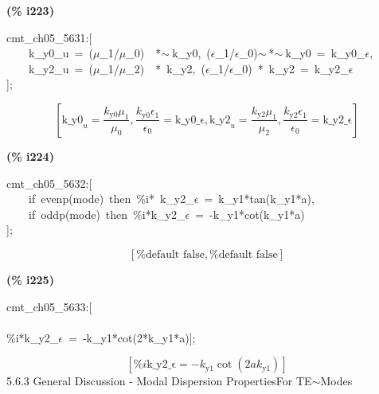 \documentclass[fleqn]{article}
\begin{document}
\noindent
\begin{minipage}[t]{4.000000em}\color{red}\bfseries
(\% i223)	
\end{minipage}
\begin{minipage}[t]{\textwidth}\color{blue}
cmt\_ch05\_5631:[\\
\ \ \ \ k\_y0\_u\ =\ (\ensuremath{\mu}\_1/\ensuremath{\mu}\_0)\ \ *\ensuremath{\sim\ }k\_y0,\ (\ensuremath{\epsilon}\_1/\ensuremath{\epsilon}\_0)\ensuremath{\sim\ }*\ensuremath{\sim\ }k\_y0\ =\ k\_y0\_\ensuremath{\epsilon},\\
\ \ \ \ k\_y2\_u\ =\ (\ensuremath{\mu}\_1/\ensuremath{\mu}\_2)\ \ *\ k\_y2,\ (\ensuremath{\epsilon}\_1/\ensuremath{\epsilon}\_0)\ *\ k\_y2\ =\ k\_y2\_\ensuremath{\epsilon}\\
];
\end{minipage}
\[\displaystyle \tag{\% o223} 
\left[ {{\ensuremath{\mathrm{k\_ y0}}}_u}=\frac{{k_{\ensuremath{\mathrm{y0}}}} {{\mu }_1}}{{{\mu }_0}}\operatorname{,}\frac{{k_{\ensuremath{\mathrm{y0}}}} {{\epsilon }_1}}{{{\epsilon }_0}}=\ensuremath{\mathrm{k\_ y0\_ \epsilon }}\operatorname{,}{{\ensuremath{\mathrm{k\_ y2}}}_u}=\frac{{k_{\ensuremath{\mathrm{y2}}}} {{\mu }_1}}{{{\mu }_2}}\operatorname{,}\frac{{k_{\ensuremath{\mathrm{y2}}}} {{\epsilon }_1}}{{{\epsilon }_0}}=\ensuremath{\mathrm{k\_ y2\_ \epsilon }}\right] \mbox{}
\]


\noindent
\begin{minipage}[t]{4.000000em}\color{red}\bfseries
(\% i224)	
\end{minipage}
\begin{minipage}[t]{\textwidth}\color{blue}
cmt\_ch05\_5632:[\\
\ \ \ \ if\ evenp(mode)\ then\ \%i*\ k\_y2\_\ensuremath{\epsilon}\ =\ k\_y1*tan(k\_y1*a),\\
\ \ \ \ if\ oddp(mode)\ then\ \%i*k\_y2\_\ensuremath{\epsilon}\ =\ -k\_y1*cot(k\_y1*a)\\
];
\end{minipage}
\[\displaystyle \tag{\% o224} 
\left[ \mbox{%
false}\operatorname{,}\mbox{%
false}\right] \mbox{}
\]


\noindent
\begin{minipage}[t]{4.000000em}\color{red}\bfseries
(\% i225)	
\end{minipage}
\begin{minipage}[t]{\textwidth}\color{blue}
cmt\_ch05\_5633:[\\
\\
\%i*k\_y2\_\ensuremath{\epsilon}\ =\ -k\_y1*cot(2*k\_y1*a)];
\end{minipage}
\[\displaystyle \tag{\% o225} 
\left[ \% i \ensuremath{\mathrm{k\_ y2\_ \epsilon }}=-{k_{\ensuremath{\mathrm{y1}}}} \cot{\left( 2 a {k_{\ensuremath{\mathrm{y1}}}}\right) }\right] \mbox{}
\]
5.6.3       General Discussion - Modal Dispersion PropertiesFor TE\ensuremath{\sim }Modes
\end{document}
